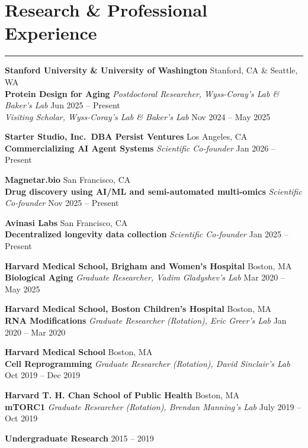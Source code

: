\documentclass[
  11pt,
]
{article}
\begin{document}
\section{Research \& Professional
Experience}\label{research-professional-experience}

\hrule

\textbf{Stanford University \& University of Washington}
\hfill Stanford, CA \& Seattle, WA\\
\textbf{Protein Design for Aging} \emph{Postdoctoral Researcher,
Wyss-Coray's Lab \& Baker's Lab} \hfill Jun 2025 -- Present\\
\emph{Visiting Scholar, Wyss-Coray's Lab \& Baker's Lab} \hfill Nov 2024
-- May 2025

\textbf{Starter Studio, Inc.~DBA Persist Ventures} \hfill Los Angeles,
CA\\
\textbf{Commercializing AI Agent Systems} \emph{Scientific Co-founder}
\hfill Jan 2026 -- Present

\textbf{Magnetar.bio} \hfill San Francisco, CA\\
\textbf{Drug discovery using AI/ML and semi-automated multi-omics}
\emph{Scientific Co-founder} \hfill Nov 2025 -- Present

\textbf{Avinasi Labs} \hfill San Francisco, CA\\
\textbf{Decentralized longevity data collection} \emph{Scientific
Co-founder} \hfill Jan 2025 -- Present

\textbf{Harvard Medical School, Brigham and Women's Hospital}
\hfill Boston, MA\\
\textbf{Biological Aging} \emph{Graduate Researcher, Vadim Gladyshev's
Lab} \hfill Mar 2020 -- May 2025

\textbf{Harvard Medical School, Boston Children's Hospital}
\hfill Boston, MA\\
\textbf{RNA Modifications} \emph{Graduate Researcher (Rotation), Eric
Greer's Lab} \hfill Jan 2020 -- Mar 2020

\textbf{Harvard Medical School} \hfill Boston, MA\\
\textbf{Cell Reprogramming} \emph{Graduate Researcher (Rotation), David
Sinclair's Lab} \hfill Oct 2019 -- Dec 2019

\textbf{Harvard T. H. Chan School of Public Health} \hfill Boston, MA\\
\textbf{mTORC1} \emph{Graduate Researcher (Rotation), Brendan Manning's
Lab} \hfill July 2019 -- Oct 2019

\textbf{Undergraduate Research} \hfill 2015 -- 2019
\end{document}
